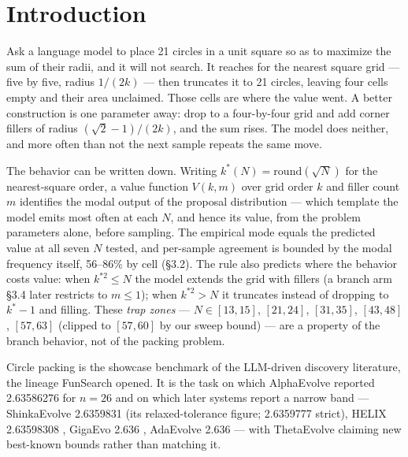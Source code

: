 \section{Introduction}

Ask a language model to place 21 circles in a unit square so as to maximize the sum of their
radii, and it will not search. It reaches for the nearest square grid --- five by five, radius
$1/(2k)$ --- then truncates it to 21 circles, leaving four cells empty and their area unclaimed.
Those cells are where the value went. A better construction is one parameter away: drop to a
four-by-four grid and add corner fillers of radius $(\sqrt{2}-1)/(2k)$, and the sum rises. The model
does neither, and more often than not the next sample repeats the same move.

The behavior can be written down. Writing $k^*(N) = \mathrm{round}(\sqrt{N})$ for the nearest-square order, a
value function $V(k, m)$ over grid order $k$ and filler count $m$ identifies the modal output of the
proposal distribution --- which template the model emits most often at each $N$, and hence its
value, from the problem parameters alone, before sampling. The empirical mode equals the predicted value at
all seven $N$ tested, and per-sample agreement is bounded by the modal frequency itself, 56--86\%
by cell (\S3.2). The rule also predicts where the behavior costs value: when $k^{*2} \le N$ the model
extends the grid with fillers (a branch arm \S3.4 later restricts to $m \le 1$); when $k^{*2} > N$ it
truncates instead of dropping to $k^*{-}1$ and
filling. These \emph{trap zones} --- $N \in [13,15]$, $[21,24]$, $[31,35]$, $[43,48]$, $[57,63]$ (clipped to
$[57,60]$ by our sweep bound) --- are a property of the branch behavior, not of the packing problem.

Circle packing is the showcase benchmark of the LLM-driven discovery literature, the lineage
FunSearch \citep{romeraparedes2024funsearch} opened. It is the task on
which AlphaEvolve \citep{novikov2025alphaevolve} reported 2.63586276 for $n = 26$ and
on which later systems report a narrow band --- ShinkaEvolve \citep{lange2025shinkaevolveopenendedsampleefficientprogram} 2.6359831 (its relaxed-tolerance figure; 2.6359777 strict), HELIX
2.63598308 \citep{su2026helixevolutionaryreinforcementlearning}, GigaEvo 2.636 \citep{khrulkov2025gigaevoopensourceoptimization}, AdaEvolve 2.636 \citep{cemri2026adaevolveadaptivellmdriven} --- with
ThetaEvolve \citep{wang2025thetaevolvetesttimelearningopen} claiming new best-known bounds rather than matching it.

